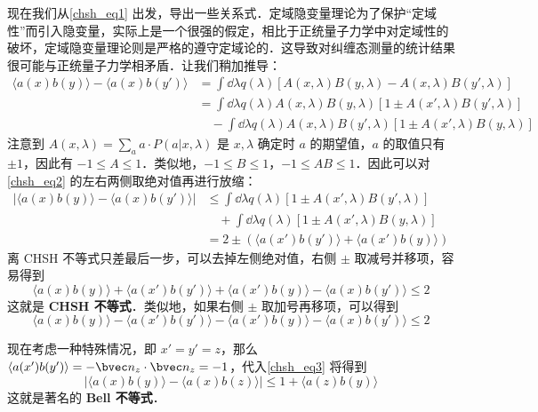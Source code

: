 现在我们从\autoref{chsh_eq1} 出发，导出一些关系式．定域隐变量理论为了保护“定域性”而引入隐变量，实际上是一个很强的假定，相比于正统量子力学中对定域性的破坏，定域隐变量理论则是严格的遵守定域论的．这导致对纠缠态测量的统计结果很可能与正统量子力学相矛盾．让我们稍加推导：
\begin{equation}\label{chsh_eq2}
\begin{aligned}
\langle a(x) b(y)\rangle - \langle a(x)b(y')\rangle &= \int \dd\lambda q(\lambda) [A(x,\lambda)B(y,\lambda)-A(x,\lambda)B(y',\lambda)]\\
&=\int \dd\lambda q(\lambda)A(x,\lambda)B(y,\lambda)[1\pm A(x',\lambda)B(y',\lambda)]\\&\quad -\int \dd\lambda q(\lambda)A(x,\lambda)B(y',\lambda)[1\pm A(x',\lambda)B(y,\lambda)]
\end{aligned}
\end{equation}
注意到 $A(x,\lambda)=\sum_a a\cdot P(a|x,\lambda)$ 是 $x,\lambda$ 确定时 $a$ 的期望值，$a$ 的取值只有 $\pm 1$，因此有 $-1\le A\le 1$．类似地，$-1\le B\le 1$，$-1\le AB\le 1$．因此可以对\autoref{chsh_eq2} 的左右两侧取绝对值再进行放缩：
\begin{equation}\label{chsh_eq3}
\begin{aligned}
|\langle a(x) b(y)\rangle - \langle a(x)b(y')\rangle|&\le \int \dd\lambda q(\lambda) [1\pm A(x',\lambda)B(y',\lambda)]\\
&\quad+\int \dd\lambda q(\lambda) [1\pm A(x',\lambda)B(y,\lambda)]\\
&=2 \pm (\langle a(x')b(y')\rangle+\langle a(x')b(y)\rangle)
\end{aligned}
\end{equation}
离 CHSH 不等式只差最后一步，可以去掉左侧绝对值，右侧 $\pm$ 取减号并移项，容易得到
\begin{equation}
\langle a(x) b(y)\rangle+
\langle a(x') b(y')\rangle+
\langle a(x') b(y)\rangle-
\langle a(x) b(y')\rangle\le 2
\end{equation}
这就是 \textbf{CHSH 不等式}．类似地，如果右侧 $\pm$ 取加号再移项，可以得到
\begin{equation}
\langle a(x) b(y)\rangle-
\langle a(x') b(y')\rangle-
\langle a(x') b(y)\rangle-
\langle a(x) b(y')\rangle\le 2
\end{equation}

现在考虑一种特殊情况，即 $x'=y'=z$，那么 $\langle a(x')b(y')\rangle = -\bvec n_z\cdot \bvec n_z=-1$，代入\autoref{chsh_eq3} 将得到
\begin{equation}
|\langle a(x) b(y)\rangle - \langle a(x)b(z)\rangle|\le 1+\langle a(z)b(y)\rangle
\end{equation}
这就是著名的 \textbf{Bell 不等式}．
